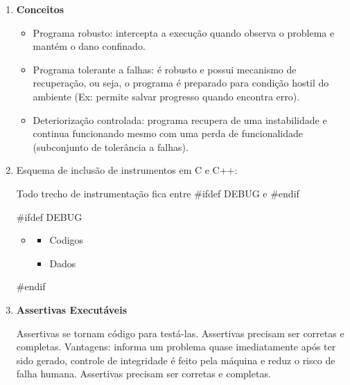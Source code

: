 \documentclass[
	12pt, %
]{fphw}
\begin{document}
\begin{doublespace}
\begin{enumerate}[label=\textbf{\arabic*)}]
        \item \textbf{Conceitos}

              \begin{itemize}

                  \item Programa robusto: intercepta a execução quando observa o problema e mantém o dano confinado.
                  \item Programa tolerante a falhas: é robusto e possui mecanismo de recuperação, ou seja, o programa é preparado para condição hostil do ambiente (Ex: permite salvar progresso quando encontra erro).
                  \item Deteriorização controlada: programa recupera de uma instabilidade e continua funcionando mesmo com uma perda de funcionalidade (subconjunto de tolerância a falhas).
              \end{itemize}

        \item Esquema de inclusão de instrumentos em C e C++:

              Todo trecho de instrumentação fica entre \#ifdef \textunderscore DEBUG e \#endif

              \#ifdef \textunderscore DEBUG

              \begin{itemize}

                \item[]

                  \begin{itemize}

                      \item Codigos

                      \item Dados

                  \end{itemize}

              \end{itemize}


              \#endif

        \item \textbf{Assertivas Executáveis}

              Assertivas se tornam código para testá-las. Assertivas precisam ser corretas e completas. Vantagens: informa um problema quase imediatamente após ter sido gerado, controle de integridade é feito pela máquina e reduz o risco de falha humana. Assertivas precisam ser corretas e completas.


\end{enumerate}
\end{doublespace}
\end{document}
